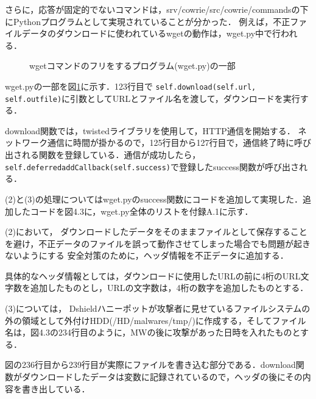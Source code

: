 \documentclass[dvipdfmx]{bta}
\begin{document}
さらに，応答が固定的でないコマンドは，srv/cowrie/src/cowrie/commandsの下にPythonプログラムとして実現されていることが分かった．
例えば，不正ファイルデータのダウンロードに使われているwgetの動作は，wget.py中で行われる．

\begin{figure}[htbp]


\caption{wgetコマンドのフリをするプログラム(wget.py)の一部}\label{fig:downloader}

\end{figure}

wget.pyの一部を図\ref{fig:downloader}に示す．123行目で
\verb!self.download(self.url, self.outfile)!に引数としてURLとファイル名を渡して，ダウンロードを実行する．

download関数では，twistedライブラリ\cite{Twisted}を使用して，HTTP通信を開始する．
ネットワーク通信に時間が掛かるので，125行目から127行目で，通信終了時に呼び出される関数を登録している．通信が成功したら，\verb!self.deferredaddCallback(self.success)!で登録したsuccess関数が呼び出される．

(2)と(3)の処理についてはwget.pyのsuccess関数にコードを追加して実現した．追加したコードを図4.3に，wget.py全体のリストを付録A.1に示す．



(2)において，
ダウンロードしたデータをそのままファイルとして保存することを避け，不正データのファイルを誤って動作させてしまった場合でも問題が起きないようにする
安全対策のために，ヘッダ情報を不正データに追加する．

具体的なヘッダ情報としては，ダウンロードに使用したURLの前に4桁のURL文字数を追加したものとし，URLの文字数は，4桁の数字を追加したものとする．

(3)については，
Dshieldハニーポットが攻撃者に見せているファイルシステムの外の領域として外付けHDD(/HD/malwares/tmp/)に作成する，そしてファイル名は，図4.3の234行目のように，MWの後に攻撃があった日時を入れたものとする．

図の236行目から239行目が実際にファイルを書き込む部分である．download関数がダウンロードしたデータは変数に記録されているので，ヘッダの後にその内容を書き出している．

\end{document}
